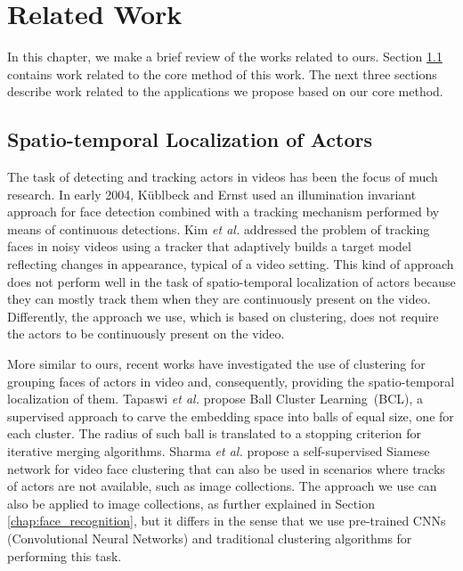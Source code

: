 \newpage

\chapter{Related Work}
\label{chap:related}

In this chapter, we make a brief review of the works related to ours. Section \ref{sec:spatio-temporal} contains work related to the core method of this work. The next three sections describe work related to the applications we propose based on our core method.

\section{Spatio-temporal Localization of Actors}
\label{sec:spatio-temporal}


The task of detecting and tracking actors in videos has been the focus of much research. In early 2004, Küblbeck and Ernst \cite{facetracking_2} used an illumination invariant approach for face detection combined with a tracking mechanism performed by means of continuous detections. Kim \emph{et al.} \cite{face_tracking} addressed the problem of tracking faces in noisy videos using a tracker that adaptively builds a target model reflecting changes in appearance, typical of a video setting. This kind of approach does not perform well in the task of spatio-temporal localization of actors because they can mostly track them when they are continuously present on the video. Differently, the approach we use, which is based on clustering, does not require the actors to be continuously present on the video.

More similar to ours, recent works have investigated the use of clustering for grouping faces of actors in video and, consequently, providing the spatio-temporal localization of them. Tapaswi \emph{et al.} \cite{video_face_clustering} propose Ball Cluster Learning~(BCL), a supervised approach to carve the embedding space into balls of equal size, one for each cluster. The radius of such ball is translated to a stopping criterion for iterative merging algorithms. Sharma \emph{et al.} \cite{self_supervised} propose a self-supervised Siamese network for video face clustering that can also be used in scenarios where tracks of actors are not available, such as image collections. The approach we use can also be applied to image collections, as further explained in Section \ref{chap:face_recognition}, but it differs in the sense that we use pre-trained CNNs (Convolutional Neural Networks) and traditional clustering algorithms for performing this task. 

